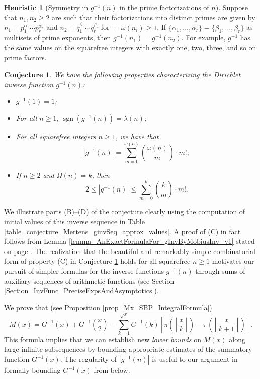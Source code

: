 \documentclass[11pt,reqno,a4letter]{article}
\numberwithin{figure}{section}
\numberwithin{table}{section}
\newcommand{\Floor}[2]{\ensuremath{\left\lfloor \frac{#1}{#2} \right\rfloor}}
\theoremstyle{plain}
\newtheorem{conjecture}[theorem]{Conjecture}
\numberwithin{theorem}{section}
\theoremstyle{definition}
\newtheorem{heuristic}[theorem]{Heuristic}
\newcommand{\NBRef}[1]{}
\begin{document}
\begin{heuristic}[Symmetry in $g^{-1}(n)$ in the prime factorizations of $n$] 
Suppose that $n_1, n_2 \geq 2$ are such that their factorizations into distinct primes are 
given by $n_1 = p_1^{\alpha_1} \cdots p_r^{\alpha_r}$ and $n_2 = q_1^{\beta_1} \cdots q_r^{\beta_r}$ 
for $ = \omega(n_i) \geq 1$. 
If $\{\alpha_1, \ldots, \alpha_r\} \equiv \{\beta_1, \ldots, \beta_r\}$ as multisets of prime exponents, 
then $g^{-1}(n_1) = g^{-1}(n_2)$. For example, $g^{-1}$ has the same values on the squarefree integers 
with exactly one, two, three, and so on prime factors.  
\end{heuristic} 

\NBRef{A01-2020-04-26}
\begin{conjecture}
\label{lemma_gInv_MxExample} 
We have the following properties characterizing the 
Dirichlet inverse function $g^{-1}(n)$: 
\begin{itemize} 

\item[\textbf{(A)}] $g^{-1}(1) = 1$; 
\item[\textbf{(B)}] For all $n \geq 1$, $\operatorname{sgn}(g^{-1}(n)) = \lambda(n)$; 
\item[\textbf{(C)}] For all squarefree integers $n \geq 1$, we have that 
     \[
     |g^{-1}(n)| = \sum_{m=0}^{\omega(n)} \binom{\omega(n)}{m} \cdot m!; 
     \]
\item[\textbf{(D)}] If $n \geq 2$ and $\Omega(n) = k$, then 
     \[
     2 \leq |g^{-1}(n)| \leq \sum_{m=0}^{k} \binom{k}{m} \cdot m!. 
     \]
\end{itemize} 
\end{conjecture} 

We illustrate parts (B)--(D) of the conjecture clearly using the computation of initial values of 
this inverse sequence in 
Table \ref{table_conjecture_Mertens_ginvSeq_approx_values}. 
A proof of (C) in fact follows from 
Lemma \ref{lemma_AnExactFormulaFor_gInvByMobiusInv_v1} 
stated on page \pageref{lemma_AnExactFormulaFor_gInvByMobiusInv_v1}. 
The realization that the beautiful and remarkably simple combinatorial form of property (C) 
in Conjecture \ref{lemma_gInv_MxExample} holds for all squarefree $n \geq 1$ 
motivates our pursuit of simpler formulas for the inverse functions $g^{-1}(n)$ 
through sums of auxiliary sequences of arithmetic functions 
(see Section \ref{Section_InvFunc_PreciseExpsAndAsymptotics}). 

We prove that (see Proposition \ref{prop_Mx_SBP_IntegralFormula}) 
\[
M(x) = G^{-1}(x) + G^{-1}\left(\frac{x}{2}\right) - 
     \sum_{k=1}^{\sqrt{x}} G^{-1}(k) \left[ 
     \pi\left(\Floor{x}{k}\right) - \pi\left(\Floor{x}{k+1}\right) 
     \right]. 
\]
This formula 
implies that we can establish new \emph{lower bounds} on $M(x)$ along large infinite subsequences 
by bounding appropriate estimates of the summatory function $G^{-1}(x)$. 
The regularity of $|g^{-1}(n)|$ is useful to our argument in formally bounding $G^{-1}(x)$ from
below. 
\end{document}

